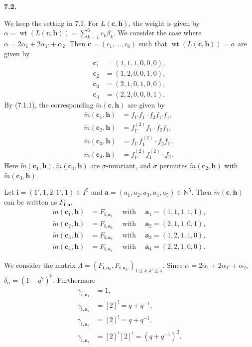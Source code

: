 \documentclass[12pt]{amsart}
\renewcommand\a{\alpha}
\renewcommand\b{\beta}
\newcommand\g{\gamma}
\renewcommand\d{\delta}
\newcommand\s{\sigma}
\newcommand\vL{\varLambda}
\renewcommand{\1}{\mathbb 1}
\newcommand{\NN}{\mathbb N}
\newcommand\Bh{\mathbf h}
\newcommand\Bi{\mathbf i}
\newcommand\Ba{\mathbf a}
\newcommand\Bc{\mathbf c}
\newcommand\iv{^{-1}}
\newcommand\wt{\widetilde}
\newcommand\weit{\operatorname{wt}}
\numberwithin{equation}{section}
\def \para#1{\par\medskip\textbf{#1}
              \addtocounter{thm}{1}}
\begin{document}
\para{7.2.}
We keep the setting in 7.1.
For $L(\Bc,\Bh)$, the weight is given by
$\a = \weit(L(\Bc,\Bh)) = \sum_{k=1}^6 c_k\b_k$.
We consider the case where $\a = 2\a_1 + 2\a_{1'} + \a_2$.
Then $\Bc = (c_1, \dots, c_6)$ such that $\weit(L(\Bc,\Bh)) = \a$ are given by
\begin{align*}
  \Bc_1 &= (1,1,1,0,0,0), \\
  \Bc_2 &= (1,2,0,0,1,0), \\
  \Bc_3 &= (2,1,0,1,0,0), \\
  \Bc_4 &= (2,2,0,0,0,1).
\end{align*}
By (7.1.1), the corresponding $\wt m(\Bc, \Bh)$ are given by
\begin{align*}
\wt m(\Bc_1, \Bh) &= f_{1'}f_1\cdot f_2f_{1'}f_1, \\
\wt m(\Bc_2, \Bh) &= f_{1'}^{(2)}f_1\cdot f_2f_1, \\
\wt m(\Bc_3, \Bh) &= f_{1'}f_1^{(2)}\cdot f_2f_{1'}, \\
\wt m(\Bc_4,\Bh)  &= f_{1'}^{(2)}f_1^{(2)}\cdot f_2. 
\end{align*}
Here $\wt m(\Bc_1, \Bh), \wt m(\Bc_4, \Bh)$ are $\s$-invariant, and
$\s$ permutes $\wt m(\Bc_2, \Bh)$ with $\wt m(\Bc_3, \Bh)$.
\par
Let $\Bi = (1', 1, 2, 1',1) \in I^5$ and $\Ba = (a_1, a_2, a_3, a_4, a_5) \in \NN^5$.
Then $\wt m(\Bc,\Bh)$ can be written as $F_{\Bi, \Ba}$, 
\begin{align*}
 \wt m(\Bc_1, \Bh) &= F_{\Bi, \Ba_1} \quad\text{ with }\quad \Ba_1 = (1,1,1,1,1), \\     
 \wt m(\Bc_2, \Bh) &= F_{\Bi, \Ba_2} \quad\text{ with }\quad \Ba_2 = (2,1,1,0,1), \\
 \wt m(\Bc_3, \Bh) &= F_{\Bi, \Ba_3} \quad\text{ with }\quad \Ba_3 = (1,2,1,1,0), \\
 \wt m(\Bc_4, \Bh) &= F_{\Bi, \Ba_4} \quad\text{ with }\quad \Ba_4 = (2,2,1,0,0). 
\end{align*}  

We consider the matrix $\vL = (F_{\Bi,\Ba_k}, F_{\Bi, \Ba_{k'}})_{1 \le k,k' \le 4}$. 
Since $\a = 2\a_1 + 2\a_{1'} + \a_2$, $\d_{\a} = (1-q^2)^5$. Furthermore
\begin{align*}
\g_{\Bi,\Ba_1} &= 1, \\ 
\g_{\Bi,\Ba_2} &= [2]^!      = q + q\iv,  \\
\g_{\Bi,\Ba_3} &= [2]^!      = q + q\iv,  \\
\g_{\Bi,\Ba_4} &= [2]^![2]^! = (q + q\iv)^2. 
\end{align*}
\end{document}
